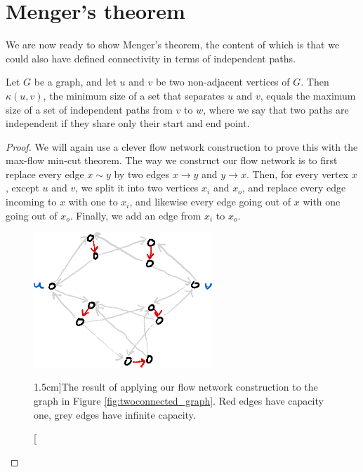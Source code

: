 \documentclass[nobib]{tufte-handout}
\begin{document}
\section{Menger's theorem}

We are now ready to show Menger's theorem, the content of which is that we could also have defined connectivity in terms of independent paths.

\begin{theorem}[Menger]
  Let $G$ be a graph, and let $u$ and $v$ be two non-adjacent vertices of $G$. Then $\kappa(u,v)$, the minimum size of a set that separates $u$ and $v$, equals the maximum size of a set of independent paths from $v$ to $w$, where we say that two paths are independent if they share only their start and end point.

  \begin{proof}
    We will again use a clever flow network construction to prove this with the max-flow min-cut theorem. The way we construct our flow network is to first replace every edge $x\sim y$ by two edges $x\to y$ and $y\to x$. Then, for every vertex $x$, except $u$ and $v$, we split it into two vertices $x_i$ and $x_o$, and replace every edge incoming to $x$ with one to $x_i$, and likewise every edge going out of $x$ with one going out of $x_o$. Finally, we add an edge from $x_i$ to $x_o$.

    \begin{figure}
      \centering
      \includegraphics[width=0.6\textwidth]{graphics/L10_connectivity/menger_theorem_construction.png}
      \caption[][1.5cm]{The result of applying our flow network construction to the graph in Figure \ref{fig:twoconnected_graph}. Red edges have capacity one, grey edges have infinite capacity.}
      \label{fig:menger_thm_construction}
    \end{figure}


\end{proof}
\end{theorem}
\end{document}
